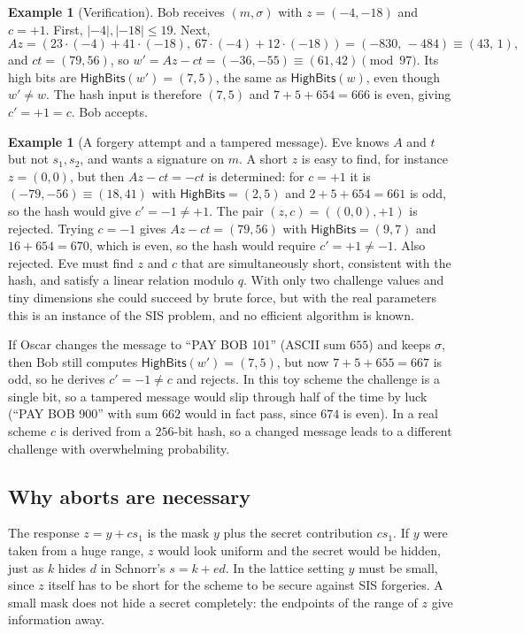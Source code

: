 \documentclass[11pt,a4paper]{article}
\theoremstyle{definition}
\newtheorem{example}[definition]{Example}
\newcommand{\HB}{\mathsf{HighBits}}
\begin{document}
\begin{example}[Verification]\label{ex:fs-ver}
Bob receives $(m,\sigma)$ with $z=(-4,-18)$ and $c=+1$. First, $|{-4}|,|{-18}|\le 19$. Next,
\[
Az=(23\cdot(-4)+41\cdot(-18),\ 67\cdot(-4)+12\cdot(-18))=(-830,\,-484)\equiv(43,\,1),
\]
and $ct=(79,56)$, so $w'=Az-ct=(-36,-55)\equiv(61,42) \pmod{97}$. Its high bits are $\HB(w')=(7,5)$, the same as $\HB(w)$, even though $w'\ne w$. The hash input is therefore $(7,5)$ and $7+5+654=666$ is even, giving $c'=+1=c$. Bob accepts.
\end{example}

\begin{example}[A forgery attempt and a tampered message]\label{ex:fs-forge}
Eve knows $A$ and $t$ but not $s_1,s_2$, and wants a signature on $m$. A short $z$ is easy to find, for instance $z=(0,0)$, but then $Az-ct=-ct$ is determined: for $c=+1$ it is $(-79,-56)\equiv(18,41)$ with $\HB=(2,5)$ and $2+5+654=661$ is odd, so the hash would give $c'=-1\ne+1$. The pair $(z,c)=((0,0),+1)$ is rejected. Trying $c=-1$ gives $Az-ct=(79,56)$ with $\HB=(9,7)$ and $16+654=670$, which is even, so the hash would require $c'=+1\ne-1$. Also rejected. Eve must find $z$ and $c$ that are simultaneously short, consistent with the hash, and satisfy a linear relation modulo $q$. With only two challenge values and tiny dimensions she could succeed by brute force, but with the real parameters this is an instance of the SIS problem, and no efficient algorithm is known.

If Oscar changes the message to ``PAY BOB 101'' (ASCII sum $655$) and keeps $\sigma$, then Bob still computes $\HB(w')=(7,5)$, but now $7+5+655=667$ is odd, so he derives $c'=-1\ne c$ and rejects. In this toy scheme the challenge is a single bit, so a tampered message would slip through half of the time by luck (``PAY BOB 900'' with sum $662$ would in fact pass, since $674$ is even). In a real scheme $c$ is derived from a $256$-bit hash, so a changed message leads to a different challenge with overwhelming probability.
\end{example}

\subsection{Why aborts are necessary}

The response $z=y+cs_1$ is the mask $y$ plus the secret contribution $cs_1$. If $y$ were taken from a huge range, $z$ would look uniform and the secret would be hidden, just as $k$ hides $d$ in Schnorr's $s=k+ed$. In the lattice setting $y$ must be small, since $z$ itself has to be short for the scheme to be secure against SIS forgeries. A small mask does not hide a secret completely: the endpoints of the range of $z$ give information away.
\end{document}
